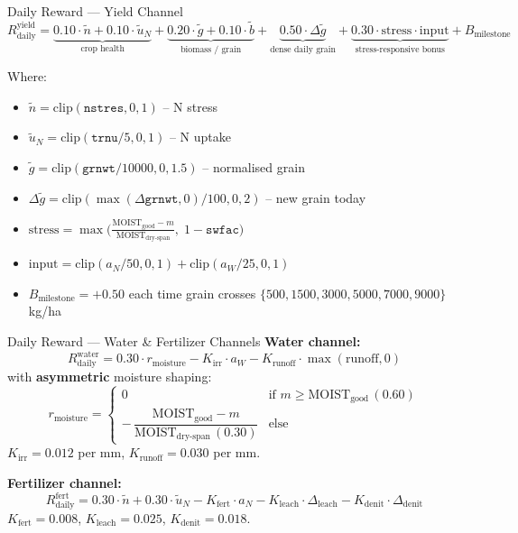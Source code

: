 \documentclass[10pt,aspectratio=169]{beamer}
\newcommand{\strong}[1]{\textbf{\textcolor{cAccent}{#1}}}
\begin{document}
\begin{frame}{Daily Reward --- Yield Channel}
  \footnotesize
  \[
  R^{\text{yield}}_{\text{daily}} =
    \underbrace{0.10 \cdot \tilde{n} + 0.10 \cdot \tilde{u}_N}_{\text{crop health}}
    + \underbrace{0.20 \cdot \tilde{g} + 0.10 \cdot \tilde{b}}_{\text{biomass / grain}}
    + \underbrace{0.50 \cdot \Delta \tilde{g}}_{\text{dense daily grain}}
    + \underbrace{0.30 \cdot \mathrm{stress} \cdot \mathrm{input}}_{\text{stress-responsive bonus}}
    + B_{\text{milestone}}
  \]

  \vspace{0.4em}
  Where:
  \begin{itemize}\small
    \item $\tilde{n} = \mathrm{clip}(\texttt{nstres}, 0, 1)$ -- N stress
    \item $\tilde{u}_N = \mathrm{clip}(\texttt{trnu}/5, 0, 1)$ -- N uptake
    \item $\tilde{g} = \mathrm{clip}(\texttt{grnwt}/10000, 0, 1.5)$ -- normalised grain
    \item $\Delta \tilde{g} = \mathrm{clip}(\max(\Delta\texttt{grnwt}, 0)/100, 0, 2)$ -- new grain today
    \item $\mathrm{stress} = \max\!\Big(\frac{\mathrm{MOIST}_{\text{good}} - m}{\mathrm{MOIST}_{\text{dry-span}}},\; 1-\texttt{swfac}\Big)$
    \item $\mathrm{input} = \mathrm{clip}(a_N/50, 0, 1) + \mathrm{clip}(a_W/25, 0, 1)$
    \item $B_{\text{milestone}} = +0.50$ each time grain crosses
      $\{500, 1500, 3000, 5000, 7000, 9000\}$ kg/ha
  \end{itemize}
\end{frame}

\begin{frame}{Daily Reward --- Water \& Fertilizer Channels}
  \textbf{Water channel:}
  \[
    R^{\text{water}}_{\text{daily}} =
      0.30 \cdot r_{\text{moisture}}
      - K_{\text{irr}} \cdot a_W
      - K_{\text{runoff}} \cdot \max(\text{runoff}, 0)
  \]
  with \strong{asymmetric} moisture shaping:
  \[
    r_{\text{moisture}} =
    \begin{cases}
      0 & \text{if } m \geq \mathrm{MOIST}_{\text{good}}\,(0.60) \\[2pt]
      -\,\dfrac{\mathrm{MOIST}_{\text{good}} - m}{\mathrm{MOIST}_{\text{dry-span}}\,(0.30)} & \text{else}
    \end{cases}
  \]
  $K_{\text{irr}} = 0.012$ per mm, $K_{\text{runoff}} = 0.030$ per mm.

  \vspace{1em}
  \textbf{Fertilizer channel:}
  \[
    R^{\text{fert}}_{\text{daily}} =
      0.30 \cdot \tilde{n} + 0.30 \cdot \tilde{u}_N
      - K_{\text{fert}} \cdot a_N
      - K_{\text{leach}} \cdot \Delta_{\text{leach}}
      - K_{\text{denit}} \cdot \Delta_{\text{denit}}
  \]
  $K_{\text{fert}} = 0.008$, $K_{\text{leach}} = 0.025$, $K_{\text{denit}} = 0.018$.
\end{frame}
\end{document}
